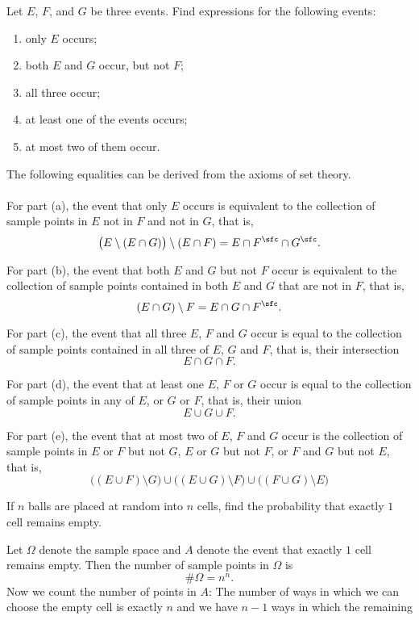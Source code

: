 \begin{problem}[DasGupta, 1.7]
  Let \(E\), \(F\), and \(G\) be three events. Find expressions for the
  following events:
  \begin{enumerate}[label=(\alph*),noitemsep]
  \item only \(E\) occurs;
  \item both \(E\) and \(G\) occur, but not \(F\);
  \item all three occur;
  \item at least one of the events occurs;
  \item at most two of them occur.
  \end{enumerate}
\end{problem}
\begin{solution}
  The following equalities can be derived from the axioms of set theory.
  \\\\
  For part (a), the event that only \(E\) occurs is equivalent to the
  collection of sample points in \(E\) not in \(F\) and not in \(G\), that
  is,
  \[
    \bigl(E\setminus(E\cap G)\bigr)\setminus(E\cap F)
    =E\cap F^\sfc\cap G^\sfc.
  \]

  For part (b), the event that both \(E\) and \(G\) but not \(F\) occur is
  equivalent to the collection of sample points contained in both \(E\) and
  \(G\) that are not in \(F\), that is,
  \[
    (E\cap G)\setminus F=E\cap G\cap F^\sfc.
  \]

  For part (c), the event that all three \(E\), \(F\) and \(G\) occur is
  equal to the collection of sample points contained in all three of \(E\),
  \(G\) and \(F\), that is, their intersection
  \[
    E\cap G\cap F.
  \]

  For part (d), the event that at least one \(E\), \(F\) or \(G\) occur is
  equal to the collection of sample points in any of \(E\), or \(G\) or
  \(F\), that is, their union
  \[
    E\cup G\cup F.
  \]

  For part (e), the event that at most two of \(E\), \(F\) and \(G\) occur
  is the collection of sample points in \(E\) or \(F\) but not \(G\), \(E\)
  or \(G\) but not \(F\), or \(F\) and \(G\) but not \(E\), that is,
  \[
   \bigl((E\cup F)\setminus G\bigr)\cup
   \bigl((E\cup G)\setminus F\bigr)\cup
   \bigl((F\cup G)\setminus E\bigr)
  \]
\end{solution}
\newpage

\begin{problem}
  If \(n\) balls are placed at random into \(n\) cells, find the
  probability that exactly \(1\) cell remains empty.
\end{problem}
\begin{solution}
  Let \(\Omega\) denote the sample space and \(A\) denote the event that
  exactly \(1\) cell remains empty. Then the number of sample points in
  \(\Omega\) is
  \[
    \#\Omega=n^n.
  \]
  Now we count the number of points in \(A\): The number of ways in which
  we can choose the empty cell is exactly \(n\) and we have \(n-1\) ways in
  which the remaining
\end{solution}
\newpage

